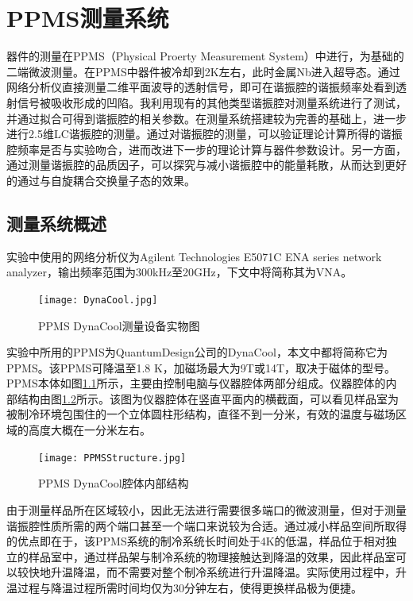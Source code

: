 
        \chapter{PPMS测量系统} %
        \label{cha:PPMS测量系统}
            器件的测量在PPMS（Physical Proerty Measurement System）中进行，为基础的二端微波测量。在PPMS中器件被冷却到2K左右，此时金属Nb进入超导态。通过网络分析仪直接测量二维平面波导的透射信号，即可在谐振腔的谐振频率处看到透射信号被吸收形成的凹陷。我利用现有的其他类型谐振腔对测量系统进行了测试，并通过拟合可得到谐振腔的相关参数。在测量系统搭建较为完善的基础上，进一步进行2.5维LC谐振腔的测量。通过对谐振腔的测量，可以验证理论计算所得的谐振腔频率是否与实验吻合，进而改进下一步的理论计算与器件参数设计。另一方面，通过测量谐振腔的品质因子，可以探究与减小谐振腔中的能量耗散，从而达到更好的通过与自旋耦合交换量子态的效果。

            \section{测量系统概述} %
            \label{sec:测量系统概述}

            实验中使用的网络分析仪为Agilent Technologies E5071C ENA series network analyzer，输出频率范围为300kHz至20GHz，下文中将简称其为VNA。


        \begin{figure}[h]
                \centering
            \texttt{[image: DynaCool.jpg]}
            \caption{PPMS DynaCool测量设备实物图\cite{QDDynaCool}}
            \label{fig:DynaCool}
        \end{figure}

            实验中所用的PPMS为QuantumDesign公司的DynaCool\cite{QDDynaCool}，本文中都将简称它为PPMS。该PPMS可降温至1.8 K，加磁场最大为9T或14T，取决于磁体的型号。PPMS本体如图\ref{fig:DynaCool}所示，主要由控制电脑与仪器腔体两部分组成。仪器腔体的内部结构由图\ref{fig:DynaCoolStructure}所示。该图为仪器腔体在竖直平面内的横截面，可以看见样品室为被制冷环境包围住的一个立体圆柱形结构，直径不到一分米，有效的温度与磁场区域的高度大概在一分米左右。


        \begin{figure}[h]
                \centering
            \texttt{[image: PPMSStructure.jpg]}
            \caption{PPMS DynaCool腔体内部结构\cite{QDDynaCool}}
            \label{fig:DynaCoolStructure}
        \end{figure}

            由于测量样品所在区域较小，因此无法进行需要很多端口的微波测量，但对于测量谐振腔性质所需的两个端口甚至一个端口来说较为合适。通过减小样品空间所取得的优点即在于，该PPMS系统的制冷系统长时间处于4K的低温，样品位于相对独立的样品室中，通过样品架与制冷系统的物理接触达到降温的效果，因此样品室可以较快地升温降温，而不需要对整个制冷系统进行升温降温。实际使用过程中，升温过程与降温过程所需时间均仅为30分钟左右，使得更换样品极为便捷。



